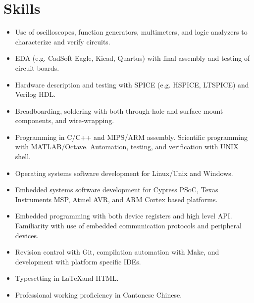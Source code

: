 \documentclass[10pt]{article}
\begin{document}
\section{Skills}
\begin{adjustwidth}{16pt}{0pt}
\begin{itemize}
	\setlength\itemsep{0pt}
	\item Use of oscilloscopes, function generators, multimeters, and logic
	analyzers to characterize and verify circuits.
	\item EDA (e.g. CadSoft Eagle, Kicad, Quartus) with final assembly and testing
	of circuit boards.
	\item Hardware description and testing with SPICE (e.g. HSPICE, LTSPICE) and
	Verilog HDL.
	\item Breadboarding, soldering with both through-hole and
	surface mount components, and wire-wrapping.
	\item Programming in C/C++ and MIPS/ARM assembly. Scientific programming with
	MATLAB/Octave. Automation, testing, and verification with UNIX shell.
	\item Operating systems software development for Linux/Unix and Windows.
	\item Embedded systems software development for Cypress PSoC,
	Texas Instruments MSP, Atmel AVR, and ARM Cortex based platforms.
	\item Embedded programming with both device registers and high level API.
	Familiarity with use of embedded communication protocols and peripheral
	devices.
	\item Revision control with Git, compilation automation with Make, and
	development with platform specific IDEs.
	\item Typesetting in \LaTeX \hspace{3pt}and HTML.
	\item Professional working proficiency in Cantonese Chinese.
\end{itemize}
\end{adjustwidth}
\end{document}
